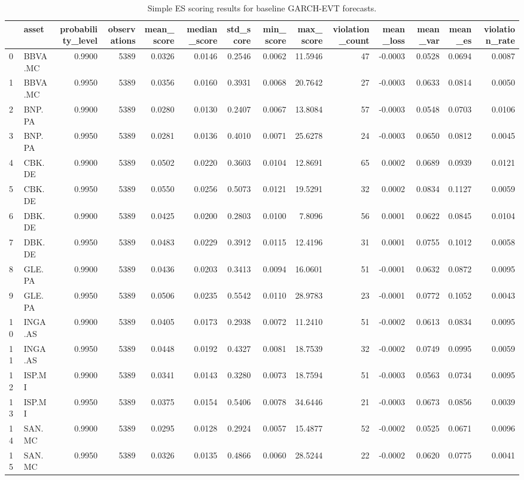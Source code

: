 \begin{table}
\caption{Simple ES scoring results for baseline GARCH-EVT forecasts.}
\label{tab:es_scoring_baseline}
\begin{tabular}{llrrrrrrrrrrrr}
\toprule
 & asset & probability_level & observations & mean_score & median_score & std_score & min_score & max_score & violation_count & mean_loss & mean_var & mean_es & violation_rate \\
\midrule
0 & BBVA.MC & 0.9900 & 5389 & 0.0326 & 0.0146 & 0.2546 & 0.0062 & 11.5946 & 47 & -0.0003 & 0.0528 & 0.0694 & 0.0087 \\
1 & BBVA.MC & 0.9950 & 5389 & 0.0356 & 0.0160 & 0.3931 & 0.0068 & 20.7642 & 27 & -0.0003 & 0.0633 & 0.0814 & 0.0050 \\
2 & BNP.PA & 0.9900 & 5389 & 0.0280 & 0.0130 & 0.2407 & 0.0067 & 13.8084 & 57 & -0.0003 & 0.0548 & 0.0703 & 0.0106 \\
3 & BNP.PA & 0.9950 & 5389 & 0.0281 & 0.0136 & 0.4010 & 0.0071 & 25.6278 & 24 & -0.0003 & 0.0650 & 0.0812 & 0.0045 \\
4 & CBK.DE & 0.9900 & 5389 & 0.0502 & 0.0220 & 0.3603 & 0.0104 & 12.8691 & 65 & 0.0002 & 0.0689 & 0.0939 & 0.0121 \\
5 & CBK.DE & 0.9950 & 5389 & 0.0550 & 0.0256 & 0.5073 & 0.0121 & 19.5291 & 32 & 0.0002 & 0.0834 & 0.1127 & 0.0059 \\
6 & DBK.DE & 0.9900 & 5389 & 0.0425 & 0.0200 & 0.2803 & 0.0100 & 7.8096 & 56 & 0.0001 & 0.0622 & 0.0845 & 0.0104 \\
7 & DBK.DE & 0.9950 & 5389 & 0.0483 & 0.0229 & 0.3912 & 0.0115 & 12.4196 & 31 & 0.0001 & 0.0755 & 0.1012 & 0.0058 \\
8 & GLE.PA & 0.9900 & 5389 & 0.0436 & 0.0203 & 0.3413 & 0.0094 & 16.0601 & 51 & -0.0001 & 0.0632 & 0.0872 & 0.0095 \\
9 & GLE.PA & 0.9950 & 5389 & 0.0506 & 0.0235 & 0.5542 & 0.0110 & 28.9783 & 23 & -0.0001 & 0.0772 & 0.1052 & 0.0043 \\
10 & INGA.AS & 0.9900 & 5389 & 0.0405 & 0.0173 & 0.2938 & 0.0072 & 11.2410 & 51 & -0.0002 & 0.0613 & 0.0834 & 0.0095 \\
11 & INGA.AS & 0.9950 & 5389 & 0.0448 & 0.0192 & 0.4327 & 0.0081 & 18.7539 & 32 & -0.0002 & 0.0749 & 0.0995 & 0.0059 \\
12 & ISP.MI & 0.9900 & 5389 & 0.0341 & 0.0143 & 0.3280 & 0.0073 & 18.7594 & 51 & -0.0003 & 0.0563 & 0.0734 & 0.0095 \\
13 & ISP.MI & 0.9950 & 5389 & 0.0375 & 0.0154 & 0.5406 & 0.0078 & 34.6446 & 21 & -0.0003 & 0.0673 & 0.0856 & 0.0039 \\
14 & SAN.MC & 0.9900 & 5389 & 0.0295 & 0.0128 & 0.2924 & 0.0057 & 15.4877 & 52 & -0.0002 & 0.0525 & 0.0671 & 0.0096 \\
15 & SAN.MC & 0.9950 & 5389 & 0.0326 & 0.0135 & 0.4866 & 0.0060 & 28.5244 & 22 & -0.0002 & 0.0620 & 0.0775 & 0.0041 \\
\bottomrule
\end{tabular}
\end{table}
